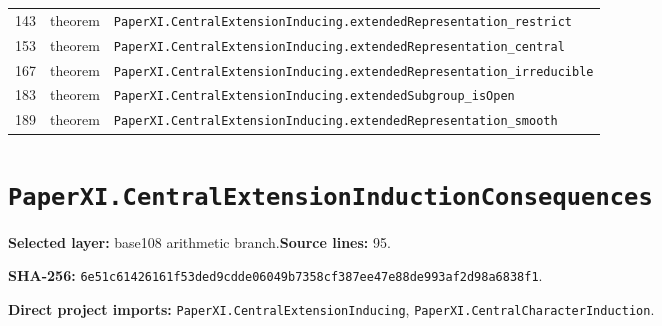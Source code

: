 \documentclass[10pt,oneside]{book}
\begin{document}
\begin{longtable}{@{}p{}p{}p{}@{}}
143&theorem&\nolinkurl{PaperXI.CentralExtensionInducing.extendedRepresentation_restrict}\\

153&theorem&\nolinkurl{PaperXI.CentralExtensionInducing.extendedRepresentation_central}\\

167&theorem&\nolinkurl{PaperXI.CentralExtensionInducing.extendedRepresentation_irreducible}\\

183&theorem&\nolinkurl{PaperXI.CentralExtensionInducing.extendedSubgroup_isOpen}\\

189&theorem&\nolinkurl{PaperXI.CentralExtensionInducing.extendedRepresentation_smooth}\\

\bottomrule\end{longtable}

\section{\texorpdfstring{\nolinkurl{PaperXI.CentralExtensionInductionConsequences}}{PaperXI.CentralExtensionInductionConsequences}}\label{module:PaperXI.CentralExtensionInductionConsequences}

\textbf{Selected layer:} base108 arithmetic branch.\quad\textbf{Source lines:} 95.\par\textbf{SHA-256:} {\scriptsize\nolinkurl{6e51c61426161f53ded9cdde06049b7358cf387ee47e88de993af2d98a6838f1}}.


\textbf{Direct project imports:} \nolinkurl{PaperXI.CentralExtensionInducing}, \nolinkurl{PaperXI.CentralCharacterInduction}.
\end{document}

